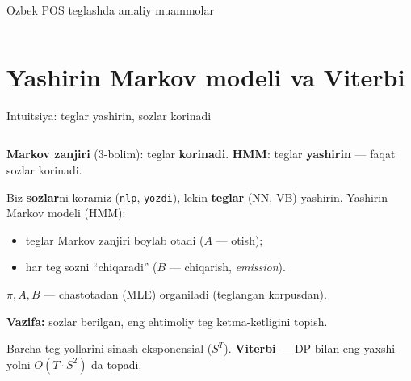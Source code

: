 \documentclass[aspectratio=169,11pt]{beamer}
\newcommand{\uzq}{\textquotesingle{}}
\begin{document}
\begin{frame}{O\uzq{}zbek POS teglashda amaliy muammolar}
\begin{columns}[T,totalwidth=\textwidth]
\begin{column}{0.46\textwidth}
\end{column}
\end{columns}

\end{frame}

\section[HMM]{Yashirin Markov modeli va Viterbi}

\begin{frame}{Intuitsiya: teglar yashirin, so\uzq{}zlar ko\uzq{}rinadi}
\footnotesize

\begin{columns}[T,totalwidth=\textwidth]
\begin{column}{0.52\textwidth}
\textbf{Markov zanjiri} (3-bo\uzq{}lim): teglar \textbf{ko\uzq{}rinadi}.\quad
\textbf{HMM}: teglar \textbf{yashirin} --- faqat so\uzq{}zlar ko\uzq{}rinadi.

\vspace{2pt}
Biz \textbf{so\uzq{}zlar}ni ko\uzq{}ramiz (\texttt{nlp}, \texttt{yozdi}), lekin
\textbf{teglar} (NN, VB) yashirin. Yashirin Markov modeli (HMM):
\begin{itemize}\setlength\itemsep{2pt}
  \item teglar Markov zanjiri bo\uzq{}ylab o\uzq{}tadi ($A$ --- o\uzq{}tish);
  \item har teg so\uzq{}zni ``chiqaradi'' ($B$ --- chiqarish, \textit{emission}).
\end{itemize}

\vspace{1pt}
{\scriptsize $\pi,A,B$ --- chastotadan (MLE) o\uzq{}rganiladi (teglangan korpusdan).}

\vspace{2pt}
\textbf{Vazifa:} so\uzq{}zlar berilgan, eng ehtimoliy teg ketma-ketligini topish.

\vspace{4pt}
\begin{tcolorbox}[okbox,left=2mm,right=2mm,top=1mm,bottom=1mm]
\scriptsize
Barcha teg yo\uzq{}llarini sinash eksponensial ($S^{T}$).
\textbf{Viterbi} --- DP bilan eng yaxshi yo\uzq{}lni $O(T\cdot S^{2})$ da topadi.
\end{tcolorbox}
\end{column}


\end{columns}
\end{frame}
\end{document}
